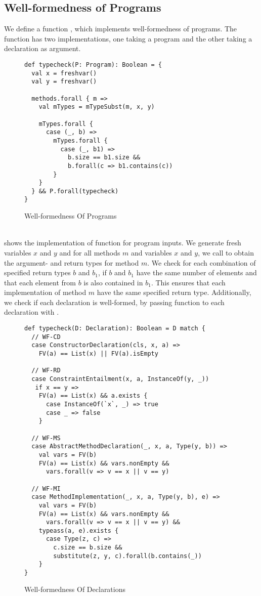 \subsection{Well-formedness of Programs}
\label{sec:wf}
We define a function ,
which implements well-formedness of programs.
The function has two implementations,
one taking a program
and the other taking a declaration
as argument.
%
\begin{figure}[h]
\begin{lstlisting}
def typecheck(P: Program): Boolean = {
  val x = freshvar()
  val y = freshvar()

  methods.forall { m =>
    val mTypes = mTypeSubst(m, x, y)

    mTypes.forall {
      case (_, b) =>
        mTypes.forall {
          case (_, b1) =>
            b.size == b1.size &&
            b.forall(c => b1.contains(c))
        }
    }
  } && P.forall(typecheck)
}
\end{lstlisting}
\caption{Well-formedness Of Programs}
\label{fig:scala-wf-prog}
\end{figure}\\
%
 shows the implementation
of function  for program inputs.
We generate fresh variables $x$ and $y$
and for all methods $m$ and variables $x$ and $y$,
we call  to obtain the argument- and return types for method $m$.
We check for each combination of specified return types  $b$ and $b_1$,
if $b$ and $b_1$ have the same number of elements
and that each element from $b$ is also contained in $b_1$.
This ensures that each implementation of method $m$
have the same specified return type.
%
Additionally, we check if each declaration is well-formed,
by passing function  to each declaration
with .
%
\begin{figure}[t]
\begin{lstlisting}
def typecheck(D: Declaration): Boolean = D match {
  // WF-CD
  case ConstructorDeclaration(cls, x, a) =>
    FV(a) == List(x) || FV(a).isEmpty
    
  // WF-RD
  case ConstraintEntailment(x, a, InstanceOf(y, _))
   if x == y =>
    FV(a) == List(x) && a.exists {
      case InstanceOf(`x`, _) => true
      case _ => false
    }
    
  // WF-MS
  case AbstractMethodDeclaration(_, x, a, Type(y, b)) =>
    val vars = FV(b)
    FV(a) == List(x) && vars.nonEmpty &&
      vars.forall(v => v == x || v == y)
      
  // WF-MI
  case MethodImplementation(_, x, a, Type(y, b), e) =>
    val vars = FV(b)
    FV(a) == List(x) && vars.nonEmpty &&
      vars.forall(v => v == x || v == y) &&
    typeass(a, e).exists {
      case Type(z, c) =>
        c.size == b.size &&
        substitute(z, y, c).forall(b.contains(_))
    }
}
\end{lstlisting}
\caption{Well-formedness Of Declarations}
\label{fig:scala-wf-decl}
\end{figure}\\
